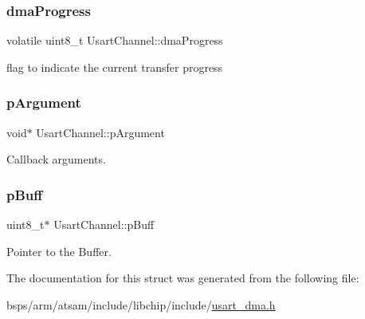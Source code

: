 \subsubsection{\texorpdfstring{dmaProgress}{dmaProgress}}
{\footnotesize\ttfamily volatile uint8\+\_\+t Usart\+Channel\+::dma\+Progress}

flag to indicate the current transfer progress \mbox{\label{structUsartChannel_abd278f7ec0073d5ab7317f3c3ffe7439}} 
\subsubsection{\texorpdfstring{pArgument}{pArgument}}
{\footnotesize\ttfamily void$\ast$ Usart\+Channel\+::p\+Argument}

Callback arguments. \mbox{\label{structUsartChannel_a75bdea3ebe5a4b2ef19560a284b027f0}} 
\subsubsection{\texorpdfstring{pBuff}{pBuff}}
{\footnotesize\ttfamily uint8\+\_\+t$\ast$ Usart\+Channel\+::p\+Buff}

Pointer to the Buffer. 

The documentation for this struct was generated from the following file\+:\begin{DoxyCompactItemize}
\item 
bsps/arm/atsam/include/libchip/include/\mbox{\hyperlink{usart__dma_8h}{usart\+\_\+dma.\+h}}\end{DoxyCompactItemize}
